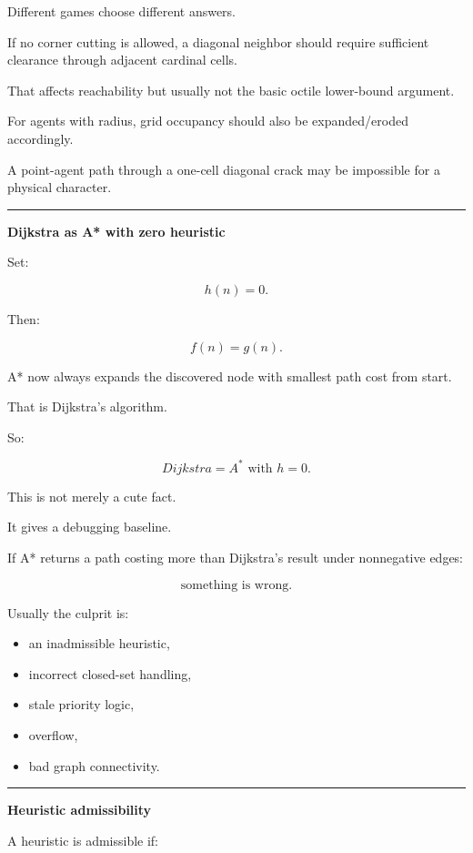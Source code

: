 Different games choose different answers.

If no corner cutting is allowed, a diagonal neighbor should require sufficient clearance through adjacent cardinal cells.

That affects reachability but usually not the basic octile lower-bound argument.

For agents with radius, grid occupancy should also be expanded/eroded accordingly.

A point-agent path through a one-cell diagonal crack may be impossible for a physical character.

\begin{center}\rule{0.5\linewidth}{0.5pt}\end{center}

\textbf{Dijkstra as A* with zero heuristic}

Set:

\[
h(n)=0.
\]

Then:

\[
f(n)=g(n).
\]

A* now always expands the discovered node with smallest path cost from start.

That is Dijkstra's algorithm.

So:

\[
\boxed{
Dijkstra
=
A^*\text{ with }h=0.
}
\]

This is not merely a cute fact.

It gives a debugging baseline.

If A* returns a path costing more than Dijkstra's result under nonnegative edges:

\[
\text{something is wrong}.
\]

Usually the culprit is:

\begin{itemize}
\tightlist
\item
  an inadmissible heuristic,
\item
  incorrect closed-set handling,
\item
  stale priority logic,
\item
  overflow,
\item
  bad graph connectivity.
\end{itemize}

\begin{center}\rule{0.5\linewidth}{0.5pt}\end{center}

\textbf{Heuristic admissibility}

A heuristic is admissible if:

